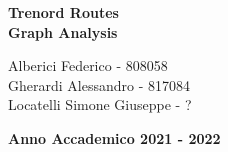 \documentclass[a4paper, 10pt]{article}
\begin{document}
\begin{titlepage}
\begin{center}
\begin{Huge}
{            \textbf{Trenord Routes \\Graph Analysis \\ }
    }
\end{Huge}
\end{center}

\vspace{40mm}
	
	
	\begin{flushright}
	    \large{Alberici Federico - 808058\\}
		\large{Gherardi Alessandro - 817084\\}
		\large{Locatelli Simone Giuseppe - ?\\}
	\end{flushright}
	
	\vspace{30mm}
	\begin{center}
		{\large{\bf Anno Accademico 2021 - 2022}}
	\end{center}


\end{titlepage}

\newpage
\tableofcontents
{} 

\newpage


\newpage

\end{document}
